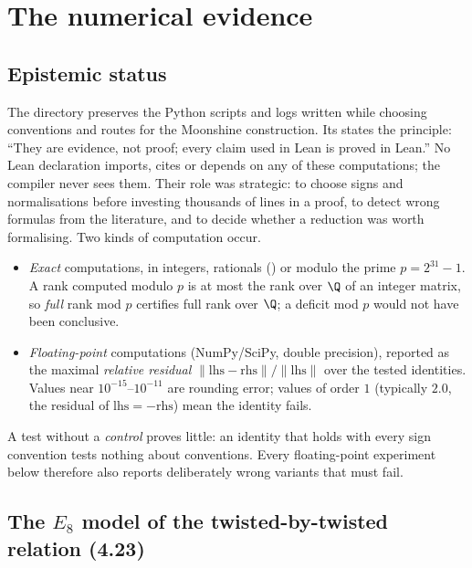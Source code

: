 \section{The numerical evidence}\label{ch15:sec:numerics}

\subsection{Epistemic status}

The directory  preserves the Python scripts and logs written
while choosing conventions and routes for the Moonshine construction. Its  states
the principle: ``They are evidence, not proof; every claim used in Lean is proved in Lean.'' No
Lean declaration imports, cites or depends on any of these computations; the compiler never sees
them. Their role was strategic: to choose signs and normalisations before investing thousands of
lines in a proof, to detect wrong formulas from the literature, and to decide whether a reduction
was worth formalising. Two kinds of computation occur.
\begin{itemize}
\item \emph{Exact} computations, in integers, rationals () or modulo the
  prime $p=2^{31}-1$. A rank computed modulo $p$ is at most the rank over $\Q$ of an integer matrix,
  so \emph{full} rank mod $p$ certifies full rank over $\Q$; a deficit mod $p$ would not have been
  conclusive.
\item \emph{Floating-point} computations (NumPy/SciPy, double precision), reported as the maximal
  \emph{relative residual} $\|\mathrm{lhs}-\mathrm{rhs}\|/\|\mathrm{lhs}\|$ over the tested identities.
  Values near $10^{-15}$--$10^{-11}$ are rounding error; values of order $1$ (typically $2.0$, the
  residual of $\mathrm{lhs}=-\mathrm{rhs}$) mean the identity fails.
\end{itemize}
A test without a \emph{control} proves little: an identity that holds with every sign convention
tests nothing about conventions. Every floating-point experiment below therefore also reports
deliberately wrong variants that must fail.

\subsection{The \texorpdfstring{$E_8$}{E8} model of the twisted-by-twisted relation (4.23)}\label{ch15:sec:num-e8}

